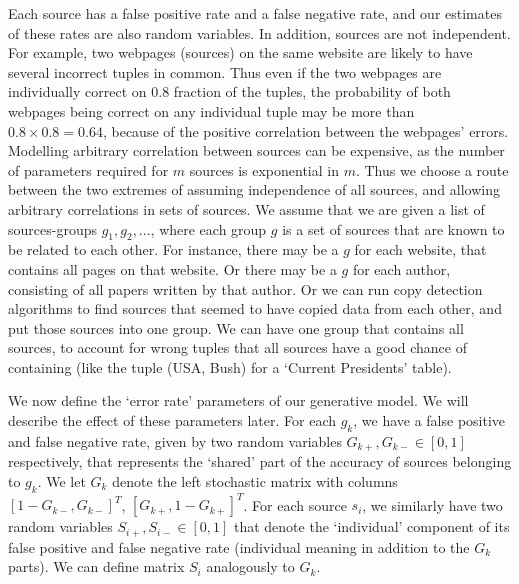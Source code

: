 \documentclass{sig-alternate}
\newcounter{prob}
\begin{document}
Each source has a false positive rate and a false negative rate, and our estimates of these rates are also random variables. In addition, sources are not independent. For example, two webpages (sources) on the same website are likely to have several incorrect tuples in common. Thus even if the two webpages are individually correct on $0.8$ fraction of the tuples, the probability of both webpages being correct on any individual tuple may be more than $0.8 \times 0.8 = 0.64$, because of the positive correlation between the webpages' errors. Modelling arbitrary correlation between sources can be expensive, as the number of parameters required for $m$ sources is exponential in $m$. Thus we choose a route between the two extremes of assuming independence of all sources, and allowing arbitrary correlations in sets of sources. We assume that we are given a list of sources-groups $g_1, g_2, ...$, where each group $g$ is a set of sources that are known to be related to each other. For instance, there may be a $g$ for each website, that contains all pages on that website. Or there may be a $g$ for each author, consisting of all papers written by that author. Or we can run copy detection algorithms to find sources that seemed to have copied data from each other, and put those sources into one group. We can have one group that contains all sources, to account for wrong tuples that all sources have a good chance of containing (like the tuple (USA, Bush) for a `Current Presidents' table).

We now define the `error rate' parameters of our generative model. We will describe the effect of these parameters later. For each $g_k$, we have a false positive and false negative rate, given by two random variables $G_{k+},G_{k-} \in [0,1]$ respectively, that represents the `shared' part of the accuracy of sources belonging to $g_k$. We let $G_k$ denote the left stochastic matrix with columns $[1-G_{k-},G_{k-}]^T$, $[G_{k+},1-G_{k+}]^T$. For each source $s_i$, we similarly have two random variables $S_{i+},S_{i-} \in [0,1]$ that denote the `individual' component of its false positive and false negative rate (individual meaning in addition to the $G_k$ parts). We can define matrix $S_i$ analogously to $G_k$. 
\end{document}
